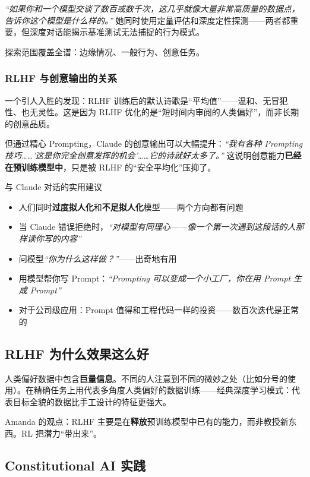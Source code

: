 \textit{``如果你和一个模型交谈了数百或数千次，这几乎就像大量非常高质量的数据点，告诉你这个模型是什么样的。''} 她同时使用定量评估和深度定性探测——两者都重要，但深度对话能揭示基准测试无法捕捉的行为模式。

探索范围覆盖全谱：边缘情况、一般行为、创意任务。

\subsubsection{RLHF 与创意输出的关系}

一个引人入胜的发现：RLHF 训练后的默认诗歌是``平均值''——温和、无冒犯性、也无灵性。这是因为 RLHF 优化的是``短时间内审阅的人类偏好''，而非长期的创意品质。

但通过精心 Prompting，Claude 的创意输出可以大幅提升：\textit{``我有各种 Prompting 技巧……'这是你完全创意发挥的机会'……它的诗就好太多了。''} 这说明创意能力\textbf{已经在预训练模型中}，只是被 RLHF 的``安全平均化''压抑了。

\begin{knowledgebox}{与 Claude 对话的实用建议}
\begin{itemize}
    \item 人们同时\textbf{过度拟人化}和\textbf{不足拟人化}模型——两个方向都有问题
    \item 当 Claude 错误拒绝时，\textit{``对模型有同理心——像一个第一次遇到这段话的人那样读你写的内容''}
    \item 问模型\textit{``你为什么这样做？''}——出奇地有用
    \item 用模型帮你写 Prompt：\textit{``Prompting 可以变成一个小工厂，你在用 Prompt 生成 Prompt''}
    \item 对于公司级应用：Prompt 值得和工程代码一样的投资——数百次迭代是正常的
\end{itemize}
\end{knowledgebox}

\subsection{RLHF 为什么效果这么好}

人类偏好数据中包含\textbf{巨量信息}。不同的人注意到不同的微妙之处（比如分号的使用）。在精确任务上用代表多角度人类偏好的数据训练——经典深度学习模式：代表目标全貌的数据比手工设计的特征更强大。

Amanda 的观点：RLHF 主要是在\textbf{释放}预训练模型中已有的能力，而非教授新东西。RL 把潜力``带出来''。

\subsection{Constitutional AI 实践}

